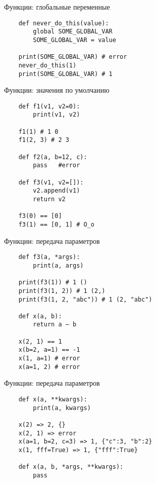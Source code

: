 \documentclass{article}
\begin{document}
\begin{center} Функции: глобальные переменные \end{center}
\vspace{15pt}
\begin{lstlisting}
    def never_do_this(value):
        global SOME_GLOBAL_VAR
        SOME_GLOBAL_VAR = value

    print(SOME_GLOBAL_VAR) # error
    never_do_this(1)
    print(SOME_GLOBAL_VAR) # 1
\end{lstlisting}
\newpage

\begin{center} Функции: значения по умолчанию \end{center}
\vspace{15pt}
\begin{lstlisting}
    def f1(v1, v2=0):
        print(v1, v2)

    f1(1) # 1 0
    f1(2, 3) # 2 3

    def f2(a, b=12, c):
        pass   #error

    def f3(v1, v2=[]):
        v2.append(v1)
        return v2

    f3(0) == [0]
    f3(1) == [0, 1] # O_o
\end{lstlisting}
\newpage

\begin{center} Функции: передача параметров \end{center}
\vspace{15pt}
\begin{lstlisting}
    def f3(a, *args):
        print(a, args)

    print(f3(1)) # 1 ()
    print(f3(1, 2)) # 1 (2,)
    print(f3(1, 2, "abc")) # 1 (2, "abc")

    def x(a, b):
        return a – b

    x(2, 1) == 1
    x(b=2, a=1) == -1
    x(1, a=1) # error
    x(a=1, 2) # error
\end{lstlisting}
\newpage

\begin{center} Функции: передача параметров \end{center}
\vspace{15pt}
\begin{lstlisting}
    def x(a, **kwargs):
        print(a, kwargs)

    x(2) => 2, {}
    x(2, 1) => error
    x(a=1, b=2, c=3) => 1, {"c":3, "b":2}
    x(1, fff=True) => 1, {"fff":True}

    def x(a, b, *args, **kwargs):
        pass
\end{lstlisting}
\newpage
\end{document}
